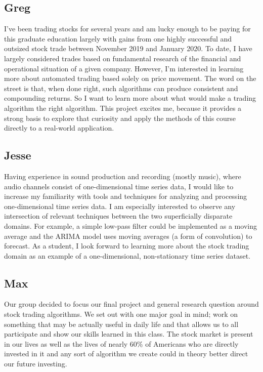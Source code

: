 \documentclass[12pt,english]{article}
\begin{document}
\subsection*{Greg}
\indent I’ve been trading stocks for several years and am lucky enough to be paying for this graduate education largely with gains from one highly successful and outsized stock trade between November 2019 and January 2020. To date, I have largely considered trades based on fundamental research of the financial and operational situation of a given company. However, I’m interested in learning more about automated trading based solely on price movement. The word on the street is that, when done right, such algorithms can produce consistent and compounding returns. So I want to learn more about what would make a trading algorithm the right algorithm. This project excites me, because it provides a strong basis to explore that curiosity and apply the methods of this course directly to a real-world application.
\subsection*{Jesse}
\indent Having experience in sound production and recording (mostly music), where audio channels consist of one-dimensional time series data, I would like to increase my familiarity with tools and techniques for analyzing and processing one-dimensional time series data. I am especially interested to observe any intersection of relevant techniques between the two superficially disparate domains. For example, a simple low-pass filter could be implemented as a moving average and the ARIMA model uses moving averages (a form of convolution) to forecast. As a student, I look forward to learning more about the stock trading domain as an example of a one-dimensional, non-stationary time series dataset.
\newpage
\subsection*{Max}
\indent Our group decided to focus our final project and general research question around stock trading algorithms. We set out with one major goal in mind; work on something that may be actually useful in daily life and that allows us to all participate and show our skills learned in this class. The stock market is present in our lives as well as the lives of nearly 60\% of Americans who are directly invested in it and any sort of algorithm we create could in theory better direct our future investing. 
\end{document}
